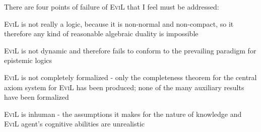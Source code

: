 There are four points of failure of \textsc{EviL} that I feel must be
addressed:
\begin{myRoman}
  \item \textsc{EviL} is not really a logic, because it is non-normal
    and non-compact, so it therefore any kind of reasonable algebraic
    duality is impossible \citep[for details on this, see][chapter 5]{blackburn_modal_2001} 
  \item \textsc{EviL} is not dynamic and therefore fails to conform to
    the prevailing paradigm for epistemic logics
    \item \textsc{EviL} is not completely formalized - only the
      completeness theorem for the central axiom system for
      \textsc{EviL} has been produced; none of the many auxiliary
      results have been formalized
    \item \textsc{EviL} is inhuman - the assumptions it makes for the
      nature of knowledge and \textsc{EviL} agent's cognitive
      abilities are unrealistic
\end{myRoman}